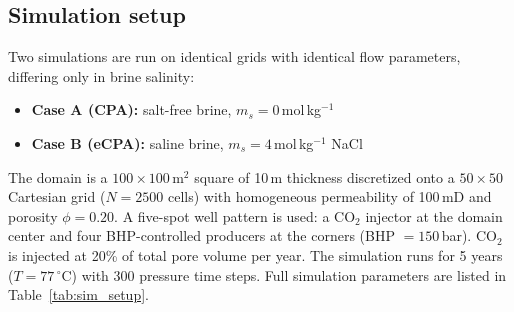 \documentclass[preprint,12pt,number]{elsarticle}
\begin{document}
\subsection*{Simulation setup}

Two simulations are run on identical grids with identical flow parameters, differing only
in brine salinity:
\begin{itemize}
  \item \textbf{Case A (CPA):} salt-free brine, $m_s = 0$\,mol\,kg$^{-1}$
  \item \textbf{Case B (eCPA):} saline brine, $m_s = 4$\,mol\,kg$^{-1}$ NaCl
\end{itemize}
The domain is a $100\times100$\,m$^2$ square of 10\,m thickness discretized onto a
$50\times50$ Cartesian grid ($N = 2500$ cells) with homogeneous permeability of 100\,mD
and porosity $\phi = 0.20$.
A five-spot well pattern is used: a CO$_2$ injector at the domain center and four
BHP-controlled producers at the corners (BHP $= 150$\,bar).
CO$_2$ is injected at 20\% of total pore volume per year.
The simulation runs for 5 years ($T = 77\,^\circ$C) with 300 pressure time steps.
Full simulation parameters are listed in Table~\ref{tab:sim_setup}.
\end{document}
